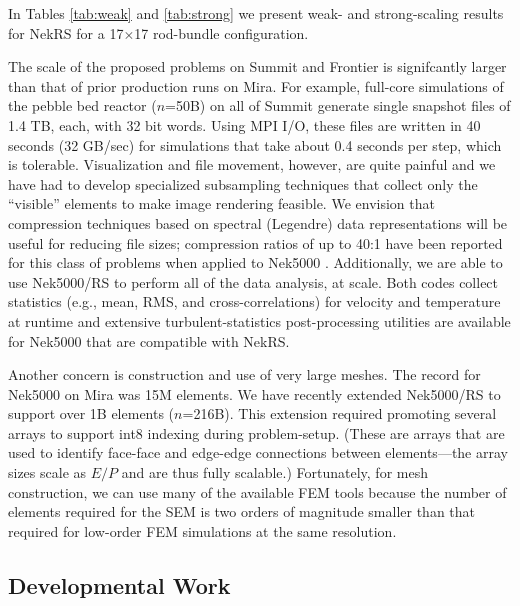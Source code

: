 \newpage
In Tables \ref{tab:weak} and \ref{tab:strong} we present weak- and strong-scaling
results for NekRS for a 17$\times$17 rod-bundle configuration.




The scale of the proposed problems on Summit and Frontier is signifcantly
larger than that of prior production runs on Mira.  For example, full-core
simulations of the pebble bed reactor  ($n$=50B) on all of Summit generate
single snapshot files of 1.4 TB, each, with 32 bit words.  Using MPI I/O, these
files are written in 40 seconds (32 GB/sec) for simulations that take about 0.4
seconds per step, which is tolerable.   Visualization and file movement,
however, are quite painful and we have had to develop specialized subsampling
techniques that collect only the ``visible'' elements to make image rendering
feasible.  We envision that compression techniques based on spectral (Legendre)
data representations will be useful for reducing file sizes; compression ratios
of up to 40:1 have been reported for this class of problems when applied to
Nek5000 \cite{otero18}.  Additionally, we are able to use Nek5000/RS to perform
all of the data analysis, at scale.  Both codes collect statistics (e.g., mean,
RMS, and cross-correlations) for velocity and temperature at runtime and
extensive turbulent-statistics post-processing utilities are available for
Nek5000 that are compatible with NekRS. 

Another concern is construction and use of very large meshes.  The record
for Nek5000 on Mira was 15M elements.  We have recently extended Nek5000/RS
to support over 1B elements ($n$=216B).   This extension required promoting
several arrays to support int8 indexing during problem-setup.  (These
are arrays that are used to identify face-face and edge-edge connections
between elements---the array sizes scale as $E/P$ and are thus fully
scalable.)   Fortunately, for mesh construction, we can use many of the 
available FEM tools because the number of elements required for the SEM
is two orders of magnitude smaller than that required for low-order FEM 
simulations at the same resolution.


\vspace{-.25in}
\subsection{Developmental Work}
\vspace{-.2in}

